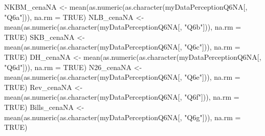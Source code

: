 \documentclass[
]{article}
\newenvironment{Shaded}{\begin{snugshade}}{\end{snugshade}}
\newcommand{\AttributeTok}[1]{\textcolor[rgb]{0.77,0.63,0.00}{#1}}
\newcommand{\ConstantTok}[1]{\textcolor[rgb]{0.00,0.00,0.00}{#1}}
\newcommand{\FunctionTok}[1]{\textcolor[rgb]{0.00,0.00,0.00}{#1}}
\newcommand{\NormalTok}[1]{#1}
\newcommand{\OtherTok}[1]{\textcolor[rgb]{0.56,0.35,0.01}{#1}}
\newcommand{\StringTok}[1]{\textcolor[rgb]{0.31,0.60,0.02}{#1}}
\begin{document}
\begin{Shaded}
\begin{Highlighting}[]
\NormalTok{NKBM\_cenaNA }\OtherTok{\textless{}{-}} \FunctionTok{mean}\NormalTok{(}\FunctionTok{as.numeric}\NormalTok{(}\FunctionTok{as.character}\NormalTok{(myDataPerceptionQ6NA[, }\StringTok{"Q6a"}\NormalTok{])), }\AttributeTok{na.rm =} \ConstantTok{TRUE}\NormalTok{)}
\NormalTok{NLB\_cenaNA }\OtherTok{\textless{}{-}} \FunctionTok{mean}\NormalTok{(}\FunctionTok{as.numeric}\NormalTok{(}\FunctionTok{as.character}\NormalTok{(myDataPerceptionQ6NA[, }\StringTok{"Q6b"}\NormalTok{])), }\AttributeTok{na.rm =} \ConstantTok{TRUE}\NormalTok{)}
\NormalTok{SKB\_cenaNA }\OtherTok{\textless{}{-}} \FunctionTok{mean}\NormalTok{(}\FunctionTok{as.numeric}\NormalTok{(}\FunctionTok{as.character}\NormalTok{(myDataPerceptionQ6NA[, }\StringTok{"Q6c"}\NormalTok{])), }\AttributeTok{na.rm =} \ConstantTok{TRUE}\NormalTok{)}
\NormalTok{DH\_cenaNA }\OtherTok{\textless{}{-}} \FunctionTok{mean}\NormalTok{(}\FunctionTok{as.numeric}\NormalTok{(}\FunctionTok{as.character}\NormalTok{(myDataPerceptionQ6NA[, }\StringTok{"Q6d"}\NormalTok{])), }\AttributeTok{na.rm =} \ConstantTok{TRUE}\NormalTok{)}
\NormalTok{N26\_cenaNA }\OtherTok{\textless{}{-}} \FunctionTok{mean}\NormalTok{(}\FunctionTok{as.numeric}\NormalTok{(}\FunctionTok{as.character}\NormalTok{(myDataPerceptionQ6NA[, }\StringTok{"Q6e"}\NormalTok{])), }\AttributeTok{na.rm =} \ConstantTok{TRUE}\NormalTok{)}
\NormalTok{Rev\_cenaNA }\OtherTok{\textless{}{-}} \FunctionTok{mean}\NormalTok{(}\FunctionTok{as.numeric}\NormalTok{(}\FunctionTok{as.character}\NormalTok{(myDataPerceptionQ6NA[, }\StringTok{"Q6f"}\NormalTok{])), }\AttributeTok{na.rm =} \ConstantTok{TRUE}\NormalTok{)}
\NormalTok{Bills\_cenaNA }\OtherTok{\textless{}{-}} \FunctionTok{mean}\NormalTok{(}\FunctionTok{as.numeric}\NormalTok{(}\FunctionTok{as.character}\NormalTok{(myDataPerceptionQ6NA[, }\StringTok{"Q6g"}\NormalTok{])), }\AttributeTok{na.rm =} \ConstantTok{TRUE}\NormalTok{)}


\end{Highlighting}
\end{Shaded}
\end{document}

